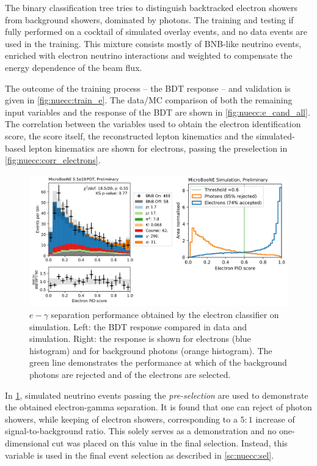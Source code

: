 \par
The binary classification tree tries to distinguish backtracked electron showers from background showers, dominated by photons. The training and testing if fully performed on a cocktail of simulated overlay events, and no data events are used in the training. This mixture consists mostly of BNB-like neutrino events, enriched with electron neutrino interactions and weighted to compensate the energy dependence of the beam flux. 
\par
The outcome of the training process -- the BDT response -- and validation is given in \cref{fig:nuecc:train_e}. The data/MC comparison of both the remaining input variables and the response of the BDT are shown in \cref{fig:nuecc:e_cand_all}. The correlation between the variables used to obtain the electron identification score, the score itself, the reconstructed lepton kinematics and the simulated-based lepton kinematics are shown for \nuecc electrons, passing the preselection in \cref{fig:nuecc:corr_electrons}.

\begin{figure}[htb]
\centering
\includegraphics[height=0.27\textheight]{NueCCsel/Images/datamc/e_bdt.jpg}
\caption[$e-\gamma$ separation performance obtained by the electron classifier on simulation]{$e-\gamma$ separation performance obtained by the electron classifier on simulation. Left: the BDT response compared in data and simulation. Right: the response is shown for \nuecc electrons (blue histogram) and for background photons (orange histogram). The green line demonstrates the performance at which of the background photons are rejected and  of the electrons are selected.}
\label{fig:egammasep}
\end{figure}

In \cref{fig:egammasep}, simulated neutrino events passing the \textit{pre-selection} are used to demonstrate the obtained electron-gamma separation. It is found that one can reject  of photon showers, while keeping  of electron showers, corresponding to a $5:1$ increase of signal-to-background ratio. This solely serves as a demonstration and no one-dimensional cut was placed on this value in the final selection. Instead, this variable is used in the final event selection as described in \cref{sc:nuecc:sel}.

